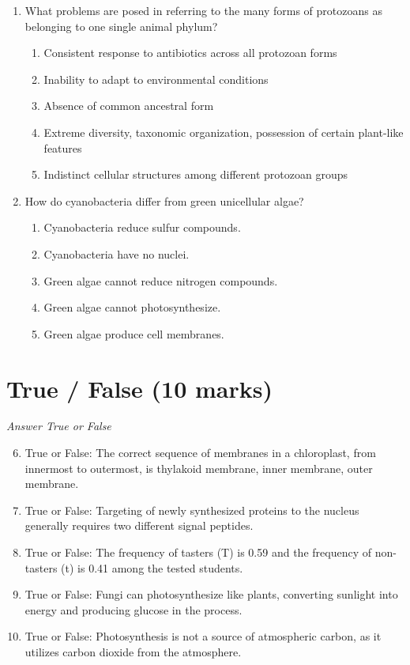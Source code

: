 \documentclass[12pt]{article}
\begin{document}
\begin{enumerate}[label=\arabic*.]
\begin{enumerate}[label=(\alph*)]
\end{enumerate}
\item What problems are posed in referring to the many forms of protozoans as belonging to one single animal phylum?
\begin{enumerate}[label=(\alph*)]
    \item Consistent response to antibiotics across all protozoan forms
    \item Inability to adapt to environmental conditions
    \item Absence of common ancestral form
    \item Extreme diversity, taxonomic organization, possession of certain plant-like features
    \item Indistinct cellular structures among different protozoan groups
\end{enumerate}
\item How do cyanobacteria differ from green unicellular algae?
\begin{enumerate}[label=(\alph*)]
    \item Cyanobacteria reduce sulfur compounds.
    \item Cyanobacteria have no nuclei.
    \item Green algae cannot reduce nitrogen compounds.
    \item Green algae cannot photosynthesize.
    \item Green algae produce cell membranes.
\end{enumerate}
\end{enumerate}

\section*{True / False (10 marks)}
\textit{Answer True or False}
\begin{enumerate}[label=\arabic*.]
\setcounter{enumi}{5}
\item True or False: The correct sequence of membranes in a chloroplast, from innermost to outermost, is thylakoid membrane, inner membrane, outer membrane.
\item True or False: Targeting of newly synthesized proteins to the nucleus generally requires two different signal peptides.
\item True or False: The frequency of tasters (T) is 0.59 and the frequency of non-tasters (t) is 0.41 among the tested students.
\item True or False: Fungi can photosynthesize like plants, converting sunlight into energy and producing glucose in the process.
\item True or False: Photosynthesis is not a source of atmospheric carbon, as it utilizes carbon dioxide from the atmosphere.
\end{enumerate}
\end{document}
